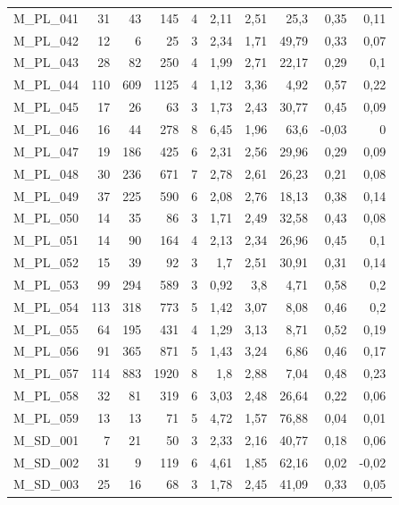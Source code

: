 \begin{table}[htbp]
\begin{tabular}{lrrrrrrrrr}
    M\_PL\_041 & 31   & 43   & 145  & 4    & 2,11 & 2,51 & 25,3 & 0,35 & 0,11 \\
    M\_PL\_042 & 12   & 6    & 25   & 3    & 2,34 & 1,71 & 49,79 & 0,33 & 0,07 \\
    M\_PL\_043 & 28   & 82   & 250  & 4    & 1,99 & 2,71 & 22,17 & 0,29 & 0,1 \\
    M\_PL\_044 & 110  & 609  & 1125 & 4    & 1,12 & 3,36 & 4,92 & 0,57 & 0,22 \\
    M\_PL\_045 & 17   & 26   & 63   & 3    & 1,73 & 2,43 & 30,77 & 0,45 & 0,09 \\
    M\_PL\_046 & 16   & 44   & 278  & 8    & 6,45 & 1,96 & 63,6 & -0,03 & 0 \\
    M\_PL\_047 & 19   & 186  & 425  & 6    & 2,31 & 2,56 & 29,96 & 0,29 & 0,09 \\
    M\_PL\_048 & 30   & 236  & 671  & 7    & 2,78 & 2,61 & 26,23 & 0,21 & 0,08 \\
    M\_PL\_049 & 37   & 225  & 590  & 6    & 2,08 & 2,76 & 18,13 & 0,38 & 0,14 \\
    M\_PL\_050 & 14   & 35   & 86   & 3    & 1,71 & 2,49 & 32,58 & 0,43 & 0,08 \\
    M\_PL\_051 & 14   & 90   & 164  & 4    & 2,13 & 2,34 & 26,96 & 0,45 & 0,1 \\
    M\_PL\_052 & 15   & 39   & 92   & 3    & 1,7  & 2,51 & 30,91 & 0,31 & 0,14 \\
    M\_PL\_053 & 99   & 294  & 589  & 3    & 0,92 & 3,8  & 4,71 & 0,58 & 0,2 \\
    M\_PL\_054 & 113  & 318  & 773  & 5    & 1,42 & 3,07 & 8,08 & 0,46 & 0,2 \\
    M\_PL\_055 & 64   & 195  & 431  & 4    & 1,29 & 3,13 & 8,71 & 0,52 & 0,19 \\
    M\_PL\_056 & 91   & 365  & 871  & 5    & 1,43 & 3,24 & 6,86 & 0,46 & 0,17 \\
    M\_PL\_057 & 114  & 883  & 1920 & 8    & 1,8  & 2,88 & 7,04 & 0,48 & 0,23 \\
    M\_PL\_058 & 32   & 81   & 319  & 6    & 3,03 & 2,48 & 26,64 & 0,22 & 0,06 \\
    M\_PL\_059 & 13   & 13   & 71   & 5    & 4,72 & 1,57 & 76,88 & 0,04 & 0,01 \\
    M\_SD\_001 & 7    & 21   & 50   & 3    & 2,33 & 2,16 & 40,77 & 0,18 & 0,06 \\
    M\_SD\_002 & 31   & 9    & 119  & 6    & 4,61 & 1,85 & 62,16 & 0,02 & -0,02 \\
    M\_SD\_003 & 25   & 16   & 68   & 3    & 1,78 & 2,45 & 41,09 & 0,33 & 0,05 \\

\end{tabular}
\end{table}
